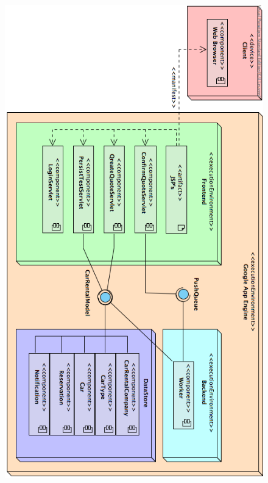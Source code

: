 \documentclass[11pt]{article}
\begin{document}
\begin{figure}[h]
  \centering
    \includegraphics[width=\textwidth,height=\textheight,keepaspectratio]{Deployment_Diagram}
\end{figure}
\end{document}
